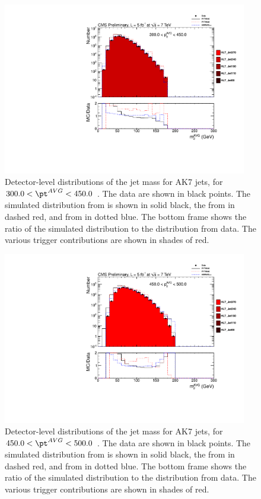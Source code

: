 \begin{figure}[htbp]
\centering
\includegraphics[width=0.95\textwidth]{figs/histAK7MjetVsPtAvg_rawDataMCComparisons_stacktrigs_pt_5}
\caption{Detector-level distributions of the jet mass for AK7 jets,
for $300.0 < \pt^{AVG} < 450.0$ \GeVc. The data are shown in black points.
The simulated distribution from \PYTHIA is shown in solid black, 
the from \PYTHIAEIGHT in dashed red, and from \HERWIG in dotted blue. 
The bottom frame shows the ratio of the simulated distribution
to the distribution from data. The various trigger contributions are shown in shades of red.
\label{figs:histAK7MjetVsPtAvg_rawDataMCComparisons_stacktrigs_pt_5}}
\end{figure}

\begin{figure}[htbp]
\centering
\includegraphics[width=0.95\textwidth]{figs/histAK7MjetVsPtAvg_rawDataMCComparisons_stacktrigs_pt_6}
\caption{Detector-level distributions of the jet mass for AK7 jets,
for $450.0 < \pt^{AVG} < 500.0$ \GeVc. The data are shown in black points.
The simulated distribution from \PYTHIA is shown in solid black, 
the from \PYTHIAEIGHT in dashed red, and from \HERWIG in dotted blue. 
The bottom frame shows the ratio of the simulated distribution
to the distribution from data. The various trigger contributions are shown in shades of red.
\label{figs:histAK7MjetVsPtAvg_rawDataMCComparisons_stacktrigs_pt_6}}
\end{figure}




